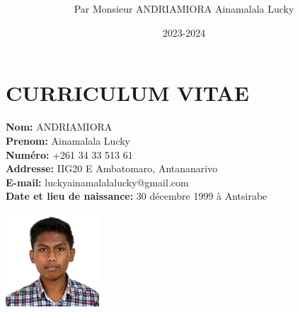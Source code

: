 \documentclass[12pt]{report}
\begin{document}
			\postdate{\end{flushright}}
			\title{
				\color{blue}
				\setlength{\fboxsep}{10pt} 
				\begin{center}
				\end{center}
			}
			\author{Par Monsieur ANDRIAMIORA Ainamalala Lucky}
			\date{2023-2024}
			\maketitle
			
			\newpage
			\thispagestyle{empty}
			\mbox{}

			\newpage
			\renewcommand{\thepage}{\Roman{page}} %
			\setcounter{page}{1}
			\chapter*{CURRICULUM VITAE}
			\begin{center}
				\begin{minipage}{0.6\textwidth}
					\textbf{Nom:} ANDRIAMIORA\\
					\textbf{Prenom:} Ainamalala Lucky\\
					\textbf{Numéro:} +261 34 33 513 61\\
					\textbf{Addresse:} IIG20 E Ambatomaro, Antananarivo\\
					\textbf{E-mail:} luckyainamalalalucky@gmail.com\\
					\textbf{Date et lieu de naissance:} 30 décembre 1999 à Antsirabe
				\end{minipage}
				\hfill
				\begin{minipage}{0.3\textwidth}
					\includegraphics[width=3.5cm, height=3.5cm]{mypic.jpg}	
				\end{minipage}
			\end{center}
\end{document}
